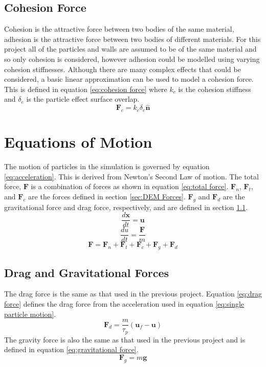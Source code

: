 \documentclass[10pt,a4paper,titlepage]{report}
\begin{document}
\subsection{Cohesion Force}
Cohesion is the attractive force between two bodies of the same material, adhesion is the attractive force between two bodies of different materials. For this project all of the particles and walls are assumed to be of the same material and so only cohesion is considered, however adhesion could be modelled using varying cohesion stiffnesses. Although there are many complex effects that could be considered\cite{tuley}, a basic linear approximation can be used to model a cohesion force. This is defined in equation \ref{eq:cohesion force} where $k_c$ is the cohesion stiffness and $\delta_e$ is the particle effect surface overlap.
\begin{equation}
\mathbf{F}_{c} = k_{c} \delta_{e} \mathbf{\hat{n}}
\label{eq:cohesion force}
\end{equation}
\section{Equations of Motion}
The motion of particles in the simulation is governed by equation \ref{eq:acceleration}. This is derived from Newton's Second Law of motion. The total force, $\mathbf{F}$ is a combination of forces as shown in equation \ref{eq:total force}. $\mathbf{F}_{n}$, $\mathbf{F}_{t}$, and $\mathbf{F}_{c}$ are the forces defined in section \ref{sec:DEM Forces}. $\mathbf{F}_{g}$ and $\mathbf{F}_{d}$ are the gravitational force and drag force, respectively, and are defined in section \ref{sec:drag and gravity}.
\begin{equation}
\dfrac{d\mathbf{x}}{dt} = \mathbf{u}
\label{eq:position}
\end{equation}
\begin{equation}
\dfrac{du}{dt} = \dfrac{\mathbf{F}}{m}
\label{eq:acceleration}
\end{equation}
\begin{equation}
\mathbf{F} = \mathbf{F}_{n} + \mathbf{F}_{t} + \mathbf{F}_{c} + \mathbf{F}_{g} + \mathbf{F}_{d}
\label{eq:total force}
\end{equation}
\subsection{Drag and Gravitational Forces}
\label{sec:drag and gravity}
The drag force is the same as that used in the previous project. Equation \ref{eq:drag force} defines the drag force from the acceleration used in equation \ref{eq:single particle motion}.
\begin{equation}
\label{eq:drag force}
\mathbf{F}_{d} = \dfrac{m}{\tau_p} (\mathbf{u}_f - \mathbf{u})
\end{equation}
The gravity force is also the same as that used in the previous project and is defined in equation \ref{eq:gravitational force}.
\begin{equation}
\label{eq:gravitational force}
\mathbf{F}_{g} = m \mathbf{g}
\end{equation}
\end{document}
